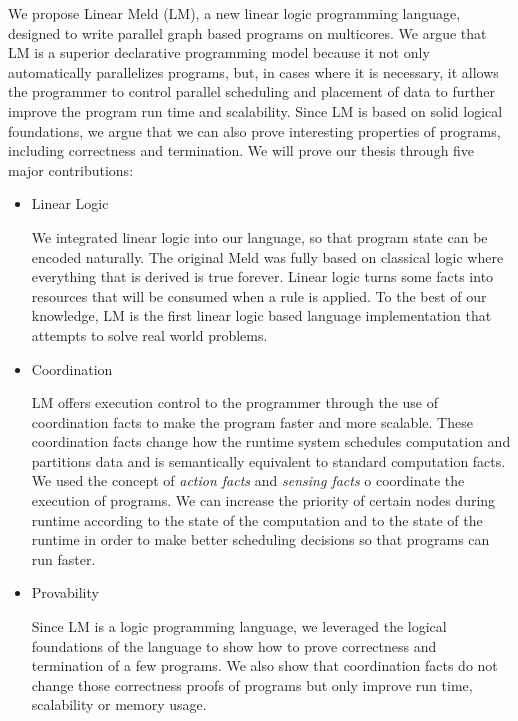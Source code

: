 
We propose Linear Meld (LM), a new linear logic programming language, designed
to write parallel graph based programs on multicores.  We argue that LM is a
superior declarative programming model because it not only automatically
parallelizes programs, but, in cases where it is necessary, it allows the
programmer to control parallel scheduling and placement of data to further
improve the program run time and scalability.  Since LM is based on solid
logical foundations, we argue that we can also prove interesting properties of
programs, including correctness and termination. We will prove our thesis
through five major contributions:

\begin{itemize}
   
   \item Linear Logic

   We integrated linear logic into our language, so that program state can be
   encoded naturally. The original Meld was fully based on classical logic where
   everything that is derived is true forever. Linear logic turns some facts
   into resources that will be consumed when a rule is applied.  To the best of
   our knowledge, LM is the first linear logic based language implementation
   that attempts to solve real world problems.


   \item Coordination
   
   LM offers execution control to the programmer through the use of coordination
   facts to make the program faster and more scalable. These coordination
   facts change how the runtime system schedules computation and partitions data
   and is semantically equivalent to standard computation facts.
   We used the concept of \emph{action facts} and \emph{sensing facts} o coordinate the execution of
   programs.  We can increase the priority of certain nodes during runtime
   according to the state of the computation and to the state of the runtime in
   order to make better scheduling decisions so that programs can run faster.
   
   \item Provability
   
   Since LM is a logic programming language, we leveraged the logical
   foundations of the language to show how to prove correctness and termination of a few
   programs. We also show that coordination facts do not change those
   correctness proofs of programs but only improve run time, scalability or
   memory usage.


\end{itemize}
